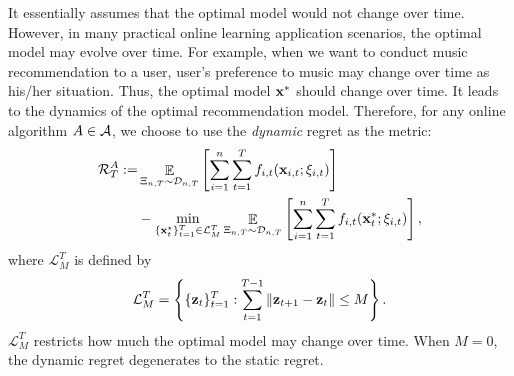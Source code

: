 \documentclass{article}
\def\rc{\color {red}}
\begin{document}
%
%
It essentially assumes that the optimal model would not change over time. However, in many practical online learning application scenarios, the optimal model may evolve over time. For example, when we want to conduct music recommendation to a user, user's preference to music may change over time as his/her situation.  Thus, the optimal model ${\bf x}^\ast$ should change over time. It leads to the dynamics of the optimal recommendation model. Therefore, for any online algorithm $A\in{\mathcal{A}}$, we choose to use the \emph{dynamic} regret as the metric:
\begin{align}
\nonumber
{\mathcal{R}}_T^{A} := & \mathop{\mathbb{E}}_{ \Xi_{n,T} \sim \mathcal{D}_{n,T} }  \left[\sum_{i=1}^n\sum_{t=1}^T f_{i,t}({\bf x}_{i,t};\xi_{i,t}) \right]
\\ \label{equa_definition_our_regret}
& - \min_{\{{\bf x}_t^\star\}_{t=1}^T \in \mathcal{L}_{M}^T}  \mathop{\mathbb{E}}_{ \Xi_{n,T} \sim \mathcal{D}_{n,T} } \left[\sum_{i=1}^n\sum_{t=1}^T f_{i,t}({\bf x}_t^\ast;\xi_{i,t}) \right],
\end{align}
where $\mathcal{L}_M^T$ is defined by
\begin{align}
\nonumber
{\mathcal{L}}_{M}^T = \left\{\{{\bf z}_t\}_{t=1}^T : \sum\limits_{t=1}^{T-1}\|{\bf z}_{t+1}-{\bf z}_t\|\le M \right\}.
\end{align} $\mathcal{L}_M^T$ restricts how much the optimal model may change over time. When $M=0$, the dynamic regret degenerates to the static regret.
\end{document}
